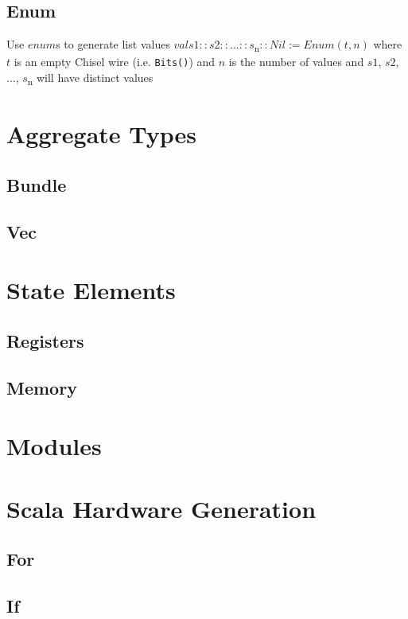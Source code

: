 \documentclass[10pt,landscape]{article}
\begin{document}
\begin{multicols}{3}
\subsection{Enum}
Use \isc$enum$s to generate list values \newline
\isc$val s1::s2::$...\isc$::s$\textsubscript{n}\isc$::Nil := Enum(t, n)$ \newline
where \isc$t$ is an empty Chisel wire (i.e. \verb$Bits()$) \newline
and \isc$n$ is the number of values \newline
and \isc$s1$, \isc$s2$, ..., \isc$s$\textsubscript{n} will have distinct values

\section{Aggregate Types}
\subsection{Bundle}

\subsection{Vec}

\section{State Elements}
\subsection{Registers}

\subsection{Memory}

\section{Modules}

\section{Scala Hardware Generation}
\subsection{For}

\subsection{If}


\end{multicols}
\end{document}
